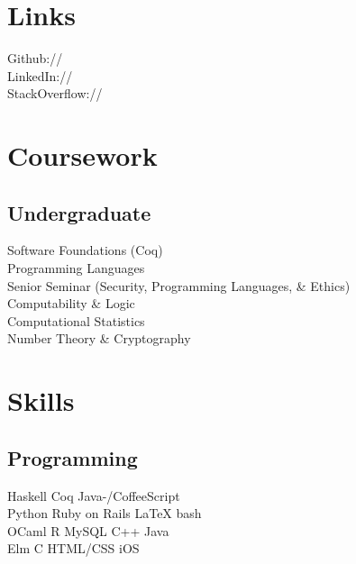 \documentclass[]{deedy-resume-openfont}
\begin{document}
\begin{minipage}[t]{0.33\textwidth}
\section{Links} 
Github:// \href{https://github.com/ericthewry}{} \\
LinkedIn://  \href{https://www.linkedin.com/in/eric-campbell-ba339490/}{} \\
StackOverflow:// \href{https://stackoverflow.com/users/8202530/ericthewry}{}
\sectionsep


\section{Coursework}

\subsection{Undergraduate}
Software Foundations (Coq) \\
Programming Languages \\
Senior Seminar (Security, Programming Languages, \& Ethics) \\
Computability \& Logic \\
Computational Statistics \\
Number Theory \& Cryptography
\sectionsep


\section{Skills}
\subsection{Programming}
Haskell \textbullet{} Coq \textbullet{} Java-/CoffeeScript   \\
Python \textbullet{} Ruby on Rails \textbullet{} \LaTeX \textbullet{} bash \\ 
OCaml \textbullet{} R \textbullet{} MySQL \textbullet{} C++ \textbullet{} Java \\
Elm \textbullet{} C  \textbullet{} HTML/CSS  \textbullet{} iOS
\sectionsep


\end{minipage}
\end{document}
